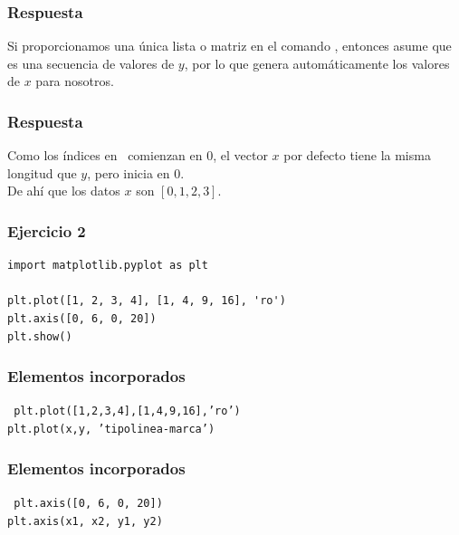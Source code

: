 \begin{frame}
\frametitle{Respuesta}
Si proporcionamos una única lista o matriz en el comando , entonces  asume que es una secuencia de valores de $y$, por lo que genera automáticamente los valores de $x$ para nosotros. 
\end{frame}
\begin{frame}
\frametitle{Respuesta}	
Como los índices en \python\ comienzan en $0$, el vector $x$ por defecto tiene la misma longitud que $y$, pero inicia en $0$. 
\\
\bigskip
De ahí que los datos $x$ son $[0,1,2,3]$.
\end{frame}
\begin{frame}[fragile]
\frametitle{Ejercicio 2}
\begin{lstlisting}[caption=Código con más elementos, basicstyle=\linespread{1.2}\ttfamily\small, columns=fullflexible]
import matplotlib.pyplot as plt

plt.plot([1, 2, 3, 4], [1, 4, 9, 16], 'ro')
plt.axis([0, 6, 0, 20])
plt.show()
\end{lstlisting}
\end{frame}
\begin{frame}[fragile]
\frametitle{Elementos incorporados}
\texttt{
plt.plot([1,2,3,4],[1,4,9,16],'ro')
\\
\bigskip
\vspace{1.5cm}
plt.plot(x,y, 'tipolinea-marca')
}
\end{frame}
\begin{frame}[fragile]
\frametitle{Elementos incorporados}
\texttt{
plt.axis([0, 6, 0, 20])
\\
\bigskip
\vspace{1.5cm}
plt.axis(x1, x2, y1, y2)
}
\end{frame}
